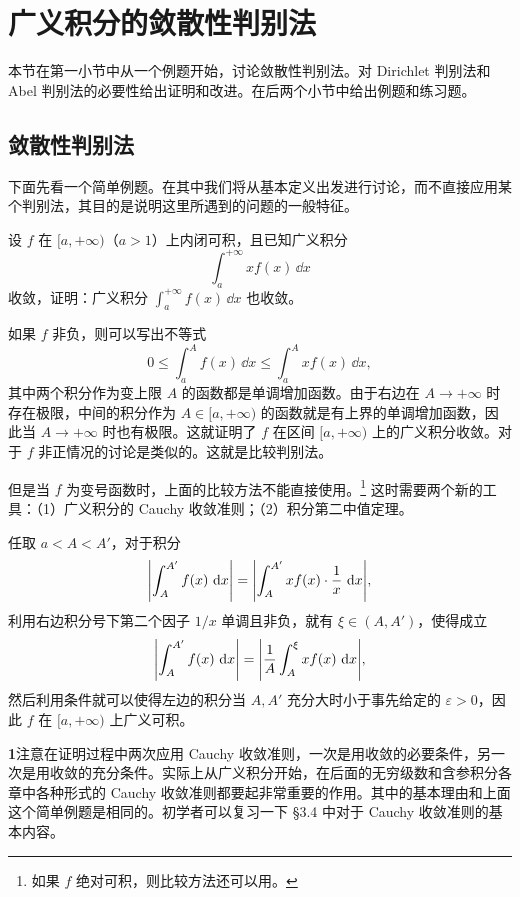 \section{广义积分的敛散性判别法}

本节在第一小节中从一个例题开始，讨论敛散性判别法。对 Dirichlet 判别法和 Abel 判别法的必要性给出证明和改进。在后两个小节中给出例题和练习题。

\subsection{敛散性判别法}

下面先看一个简单例题。在其中我们将从基本定义出发进行讨论，而不直接应用某个判别法，其目的是说明这里所遇到的问题的一般特征。

\begin{xexample}[12.2.1]
设 $f$ 在 $[a,+\infty)$（$a>1$）上内闭可积，且已知广义积分
\[
  \int_a^{+\infty}x f(x)\,\dd x
\]
收敛，证明：广义积分 $\int_a^{+\infty}f(x)\,\dd x$ 也收敛。
\end{xexample}
\begin{xproof}
如果 $f$ 非负，则可以写出不等式
\[
  0\leq\int_a^A f(x)\,\dd x\leq\int_a^A x f(x)\,\dd x,
\]
其中两个积分作为变上限 $A$ 的函数都是单调增加函数。由于右边在 $A\to+\infty$ 时存在极限，中间的积分作为 $A\in[a,+\infty)$ 的函数就是有上界的单调增加函数，因此当 $A\to+\infty$ 时也有极限。这就证明了 $f$ 在区间 $[a,+\infty)$ 上的广义积分收敛。对于 $f$ 非正情况的讨论是类似的。这就是比较判别法。

但是当 $f$ 为变号函数时，上面的比较方法不能直接使用。\footnote{如果 $f$ 绝对可积，则比较方法还可以用。} 这时需要两个新的工具：（1）广义积分的 Cauchy 收敛准则；（2）积分第二中值定理。

任取 $a<A<A'$，对于积分
\[
  \abs*{\int_A^{A'}f(x)\,\dd x}
  =\abs*{\int_A^{A'}xf(x)\cdot\frac1x\,\dd x},
\]
利用右边积分号下第二个因子 $1/x$ 单调且非负，就有 $\xi\in(A,A')$，使得成立
\[
  \abs*{\int_A^{A'}f(x)\,\dd x}
  =\abs*{\frac1A\int_A^\xi x f(x)\,\dd x},
\]
然后利用条件就可以使得左边的积分当 $A,A'$ 充分大时小于事先给定的 $\varepsilon>0$，因此 $f$ 在 $[a,+\infty)$ 上广义可积。
\end{xproof}

\begin{xremark}
\textbf{1}\quad 注意在证明过程中两次应用 Cauchy 收敛准则，一次是用收敛的必要条件，另一次是用收敛的充分条件。实际上从广义积分开始，在后面的无穷级数和含参积分各章中各种形式的 Cauchy 收敛准则都要起非常重要的作用。其中的基本理由和上面这个简单例题是相同的。初学者可以复习一下 §3.4 中对于 Cauchy 收敛准则的基本内容。
\end{xremark}

